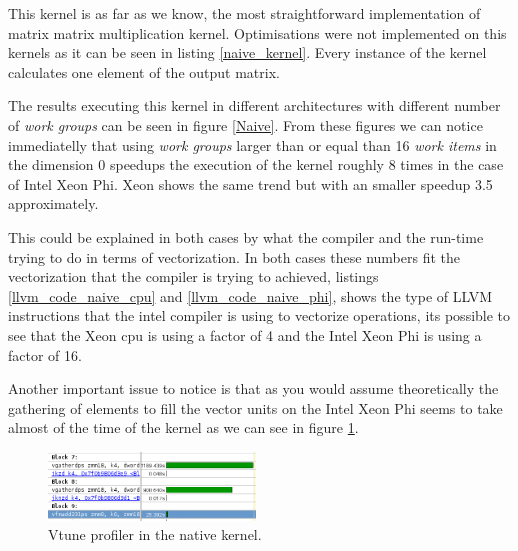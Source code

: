 \par{This kernel is as far as we know, the most straightforward implementation of matrix matrix multiplication kernel.
    Optimisations were not implemented on this kernels as it can be seen in listing \ref{naive_kernel}. Every instance
    of the kernel calculates one element of the output matrix.}



\par{The results executing this kernel in different architectures with different number of \emph{work groups } can be seen 
in figure \ref{Naive}. From these figures we can notice immediatelly that using \emph{work groups} larger than or equal than 16
\emph{work items} in the dimension 0 speedups the execution of the kernel roughly 8 times in the case of Intel Xeon Phi.
Xeon shows the same trend but with an smaller speedup 3.5 approximately.}





\par{This could be explained in both cases by what the compiler and the run-time trying to do in terms of vectorization. In both 
cases these numbers fit the vectorization that the compiler is trying to achieved, listings 
\ref{llvm_code_naive_cpu} and \ref{llvm_code_naive_phi}, shows the type of LLVM instructions that the intel compiler is using to 
vectorize operations, its possible to see that the Xeon cpu is using a factor of 4 and the Intel Xeon Phi is using a factor of 16.}

\par{Another important issue to notice is that as you would assume theoretically the gathering of elements to fill the vector 
units on the Intel Xeon Phi seems to take almost of the time of the kernel as we can see in figure \ref{vtune_naive}.}

\begin{figure}[!h]
    \centering
    \includegraphics[width=0.49\textwidth]{figures/vtune_naive.png}
    \caption{Vtune profiler in the native kernel.}
    \label{vtune_naive}
\end{figure}

